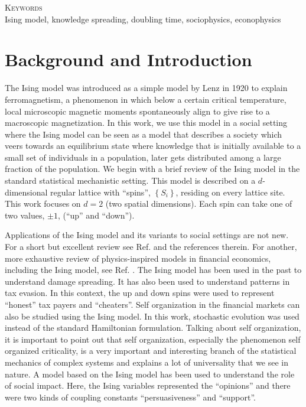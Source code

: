 \documentclass[a4paper,12pt]{article}
\begin{document}
\vspace{1in}

\begin{center}
  \textsc{Keywords}\\
  \noindent
  Ising model, knowledge spreading, doubling time,
  sociophysics, econophysics
\end{center}

\clearpage\pagebreak
\section{Background and Introduction}
The Ising model \cite{ising25} was introduced as a simple model
by Lenz in 1920 to explain ferromagnetism, a phenomenon in which
below a certain critical temperature, local microscopic
magnetic moments spontaneously align to give rise to a macroscopic
magnetization. 
In this work, we use this model in a social setting where the
Ising model can be seen as a model that describes a society which
veers towards an equilibrium state where knowledge that is initially
available to a small set of individuals in a population,
later gets distributed among a large fraction of the population.
We begin with a brief review of the Ising model in
the standard statistical mechanistic setting.
This model is described on a $d$-dimensional regular lattice with ``spins'',
$\left\{S_i\right\}$,
residing on every lattice site.
This work focuses on $d=2$ (two spatial dimensions).
Each spin can take one of two values, $\pm1$, (``up'' and ``down'').


Applications of the Ising model and its variants to social settings are
not new.
For a short but excellent review see Ref. \cite{stauffer08} and the
references therein.
For another, more exhaustive review of physics-inspired models
in financial economics, including the Ising model, see Ref. \cite{sornette14}.
The Ising model has been used in the past to understand damage spreading.\cite{svenson02}
It has also been used to understand patterns in tax evasion.\cite{zaklan09}
In this context, the up and down spins were used to
represent ``honest'' tax payers and ``cheaters''.
Self organization in the financial markets can also be studied using the
Ising model.\cite{zhou07}
In this work, stochastic evolution was
used instead of the standard Hamiltonian formulation.
Talking about self organization, it is important to point out that
self organization, especially the phenomenon self organized criticality,
is a very important and interesting branch of the statistical mechanics
of complex systems and explains a lot of universality that we see in nature.\cite{bak88}
A model based on the Ising model has been used to understand the
role of social impact.\cite{kohring96}
Here, the Ising variables represented the ``opinions'' and
there were two kinds of coupling constants ``persuasiveness'' and ``support''.
\end{document}
